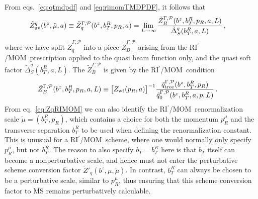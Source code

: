 \documentclass[11pt,a4paper]{article}
\DeclareRobustCommand{\eq}[1]{eq.~\eqref{eq:#1}}
\DeclareRobustCommand{\eqs}[2]{eqs.~\eqref{eq:#1} and \eqref{eq:#2}}
\newcommand{\MS}{{\overline{\mathrm{MS}}}}
\newcommand{\cP}{\mathcal{P}}
\newcommand{\RIpMOM}{RI$^\prime$/MOM}
\begin{document}
From \eqs{qtmdpdf}{rimomTMDPDF}, it follows that
\begin{align} \label{eq:ZqRIMOM}
 \tilde Z_{\rm uv}^q(b^z,\tilde\mu,a) &\equiv \tilde Z^{\Gamma,\cP}_q(b^z, b_T^R, p_R, a)
 = \lim_{L\to\infty} \frac{\tilde Z^{\Gamma,\cP}_B(b^z, b_T^R, p_R, a, L)}{\tilde\Delta_S^q(b_T^R,a,L)}
\,,\end{align}
where we have split $\tilde Z_q^{\Gamma,\cP}$ into a piece $\tilde Z^{\Gamma,\cP}_B$ arising from the \RIpMOM\ prescription applied to the quasi beam function only, and the quasi soft factor $\tilde\Delta_S^q(b_T^R,a,L)$. The $\tilde Z^{\Gamma,\cP}_B$ is given by the \RIpMOM\ condition
\begin{align} \label{eq:ZBRIMOM}
 \tilde Z^{\Gamma,\cP}_B(b^z, b_T^R, p_R, a, L) &\equiv \bigl[Z_{\rm wf}(p_R,a)\bigr]^{-1} \frac{\tilde{q}^{\Gamma,\cP}_{\rm tree}(b^z,b_T^R,p_R)}{\tilde q^{\Gamma,\cP}_0(b^z,b_T^R, a, p, L)}
\,.\end{align}
From \eq{ZqRIMOM} we can also identify the \RIpMOM~renormalization scale $\tilde\mu=(b_T^R,p_R)$, which contains a choice for both the momentum $p_R^\mu$ and the transverse separation $b_T^R$ to be used when defining the renormalization constant.
This is unusual for a \RIpMOM~scheme, where one would normally only specify $p_R^\mu$, but not $b_T^R$.
The reason to also specify $b_T = b_T^R$ here is that $b_T$ itself can become a nonperturbative scale, and hence must not enter the perturbative scheme conversion factor $\tilde Z'_q(b^z,\mu,\tilde\mu)$.
In contrast, $b_T^R$ can always be chosen to be a perturbative scale, similar to $p_R^\mu$, thus ensuring that this scheme conversion factor to $\MS$ remains perturbatively calculable.
\end{document}
